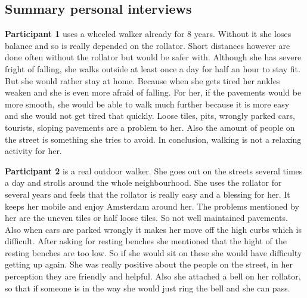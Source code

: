 




\subsection{Summary personal interviews}
\textbf{Participant 1} uses a wheeled walker already for 8 years. Without it she loses balance and so is really depended on the rollator. Short distances however are done often without the rollator but would be safer with. Although she has severe fright of falling, she walks outside at least once a day for half an hour to stay fit. But she would rather stay at home. Because when she gets tired her ankles weaken and she is even more afraid of falling. For her, if the pavements would be more smooth, she would be able to walk much further because it is more easy and she would not get tired that quickly. Loose tiles, pits, wrongly parked cars, tourists, sloping pavements are a problem to her. Also the amount of people on the street is something she tries to avoid. In conclusion, walking is not a relaxing activity for her.

\textbf{Participant 2} is a real outdoor walker. She goes out on the streets several times a day and strolls around the whole neighbourhood. She uses the rollator for several years and feels that the rollator is really easy and a blessing for her. It keeps her mobile and enjoy Amsterdam around her. The problems mentioned by her are the uneven tiles or half loose tiles. So not well maintained pavements. Also when cars are parked wrongly it makes her move off the high curbs which is difficult. After asking for resting benches she mentioned that the hight of the resting benches are too low. So if she would sit on these she would have difficulty getting up again. She was really positive about the people on the street, in her perception they are friendly and helpful. Also she attached a bell on her rollator, so that if someone is in the way she would just ring the bell and she can pass. 

